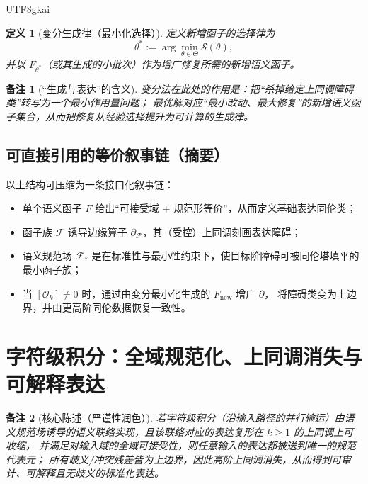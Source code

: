 \documentclass[12pt]{article}
\newtheorem{definition}{定义}[section]
\newtheorem{remark}{备注}[section]
\begin{document}
\begin{CJK*}{UTF8}{gkai}
\begin{definition}[变分生成律（最小化选择）]
定义新增函子的选择律为
\[
\theta^\ast:=\arg\min_{\theta\in\Theta}\mathcal{S}(\theta),
\]
并以 $F_{\theta^\ast}$（或其生成的小批次）作为增广修复所需的新增语义函子。
\end{definition}

\begin{remark}[“生成与表达”的含义]
变分法在此处的作用是：把“杀掉给定上同调障碍类”转写为一个最小作用量问题；
最优解对应“最小改动、最大修复”的新增语义函子集合，从而把修复从经验选择提升为可计算的生成律。\cite{BV1981}
\end{remark}

\subsection{可直接引用的等价叙事链（摘要）}
\label{subsec:tex20-ch2-summary-chain}

以上结构可压缩为一条接口化叙事链：
\begin{itemize}
  \item 单个语义函子 $F$ 给出“可接受域 + 规范形等价”，从而定义基础表达同伦类；
  \item 函子族 $\mathcal{F}$ 诱导边缘算子 $\partial_{\mathcal{F}}$，其（受控）上同调刻画表达障碍；
  \item 语义规范场 $\mathcal{F}_\ast$ 是在标准性与最小性约束下，使目标阶障碍可被同伦塔填平的最小函子族；
  \item 当 $[\mathcal{O}_k]\neq 0$ 时，通过由变分最小化生成的 $F_{\mathrm{new}}$ 增广 $\partial$，
  将障碍类变为上边界，并由更高阶同伦数据恢复一致性。
\end{itemize}

\clearpage

\section{字符级积分：全域规范化、上同调消失与可解释表达}

\begin{remark}[核心陈述（严谨性润色）]
若字符级积分（沿输入路径的并行输运）由语义规范场诱导的语义联络实现，且该联络对应的表达复形在 $k\ge 1$ 的上同调上可收缩，
并满足对输入域的全域可接受性，则任意输入的表达都被送到唯一的规范代表元；
所有歧义/冲突残差皆为上边界，因此高阶上同调消失，从而得到可审计、可解释且无歧义的标准化表达。\cite{GaoZhengAppVol3,EdgeOperatorTowerTex17,AxiomSemanticsWorkflowTex18}
\end{remark}


\end{CJK*}
\end{document}
